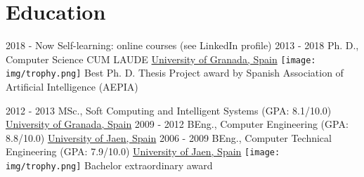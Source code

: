 \documentclass[letterpaper]{twentysecondcv} %
\begin{document}
\makeprofile %

\section{Education}

\begin{twenty} %
	\twentyitem
    	{2018 - Now}
        {}
        {Self-learning: online courses (see LinkedIn profile)}
        {\href{}{}}
        {}
        {}
	\twentyitem
    	{2013 - 2018}
        {}
        {Ph. D., Computer Science \textnormal{CUM LAUDE}}
        {\href{http://www.ugr.es/}{University of Granada, Spain}}
        {{\texttt{[image: img/trophy.png]}} Best Ph. D. Thesis Project award by Spanish Association of
Artificial Intelligence (AEPIA)}
        {}
	
	\twentyitem
    	{2012 - 2013}
        {}
        {MSc., Soft Computing and Intelligent Systems \textnormal{(GPA: 8.1/10.0)}}
        {\href{http://www.ugr.es/}{University of Granada, Spain}}
        {}
        {}
	\twentyitem
    	{2009 - 2012}
		{}
        {BEng., Computer Engineering \textnormal{(GPA: 8.8/10.0)}}
        {\href{http://www.ujaen.es/}{University of Jaen, Spain}}
        {}
        {}
   \twentyitem
    	{2006 - 2009}
		{}
        {BEng., Computer Technical Engineering \textnormal{(GPA: 7.9/10.0)}}
        {\href{http://www.ujaen.es/}{University of Jaen, Spain}}
        {{\texttt{[image: img/trophy.png]}} Bachelor extraordinary award}
        {}
\end{twenty}

\end{document}
